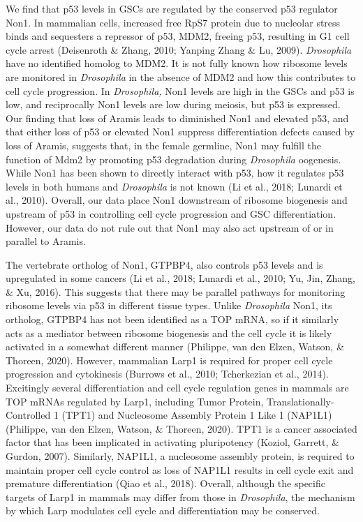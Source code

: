 \documentclass[12pt,oneside]{reedthesis}
\begin{document}
We find that p53 levels in GSCs are regulated by the conserved p53 regulator Non1. In mammalian cells, increased free RpS7 protein due to nucleolar stress binds and sequesters a repressor of p53, MDM2, freeing p53, resulting in G1 cell cycle arrest (Deisenroth \& Zhang, 2010; Yanping Zhang \& Lu, 2009). \emph{Drosophila} have no identified homolog to MDM2. It is not fully known how ribosome levels are monitored in \emph{Drosophila} in the absence of MDM2 and how this contributes to cell cycle progression. In \emph{Drosophila,} Non1 levels are high in the GSCs and p53 is low, and reciprocally Non1 levels are low during meiosis, but p53 is expressed. Our finding that loss of Aramis leads to diminished Non1 and elevated p53, and that either loss of p53 or elevated Non1 suppress differentiation defects caused by loss of Aramis, suggests that, in the female germline, Non1 may fulfill the function of Mdm2 by promoting p53 degradation during \emph{Drosophila} oogenesis. While Non1 has been shown to directly interact with p53, how it regulates p53 levels in both humans and \emph{Drosophila} is not known (Li et al., 2018; Lunardi et al., 2010). Overall, our data place Non1 downstream of ribosome biogenesis and upstream of p53 in controlling cell cycle progression and GSC differentiation. However, our data do not rule out that Non1 may also act upstream of or in parallel to Aramis.

The vertebrate ortholog of Non1, GTPBP4, also controls p53 levels and is upregulated in some cancers (Li et al., 2018; Lunardi et al., 2010; Yu, Jin, Zhang, \& Xu, 2016). This suggests that there may be parallel pathways for monitoring ribosome levels via p53 in different tissue types. Unlike \emph{Drosophila} Non1, its ortholog, GTPBP4 has not been identified as a TOP mRNA, so if it similarly acts as a mediator between ribosome biogenesis and the cell cycle it is likely activated in a somewhat different manner (Philippe, van den Elzen, Watson, \& Thoreen, 2020). However, mammalian Larp1 is required for proper cell cycle progression and cytokinesis (Burrows et al., 2010; Tcherkezian et al., 2014). Excitingly several differentiation and cell cycle regulation genes in mammals are TOP mRNAs regulated by Larp1, including Tumor Protein, Translationally-Controlled 1 (TPT1) and Nucleosome Assembly Protein 1 Like 1 (NAP1L1) (Philippe, van den Elzen, Watson, \& Thoreen, 2020). TPT1 is a cancer associated factor that has been implicated in activating pluripotency (Koziol, Garrett, \& Gurdon, 2007). Similarly, NAP1L1, a nucleosome assembly protein, is required to maintain proper cell cycle control as loss of NAP1L1 results in cell cycle exit and premature differentiation (Qiao et al., 2018). Overall, although the specific targets of Larp1 in mammals may differ from those in \emph{Drosophila}, the mechanism by which Larp modulates cell cycle and differentiation may be conserved.
\end{document}
